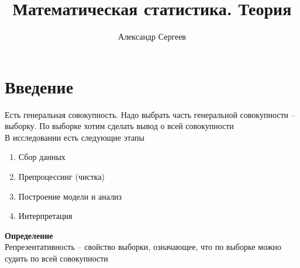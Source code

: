 \documentclass[12pt]{article}
\title{Математическая статистика. Теория}
\author{Александр Сергеев}
\date{}
\begin{document}
\maketitle
\section{Введение}
Есть генеральная совокупность. Надо выбрать часть генеральной совокупности -- выборку. По выборке хотим сделать вывод о всей совокупности\\
В исследовании есть следующие этапы
\begin{enumerate}
	\item Сбор данных
	\item Препроцессинг (чистка)
	\item Построение модели и анализ
	\item Интерпретация
\end{enumerate}
\textbf{Определение}\\
Репрезентативность -- свойство выборки, означающее, что по выборке можно судить по всей совокупности\\
\end{document}
